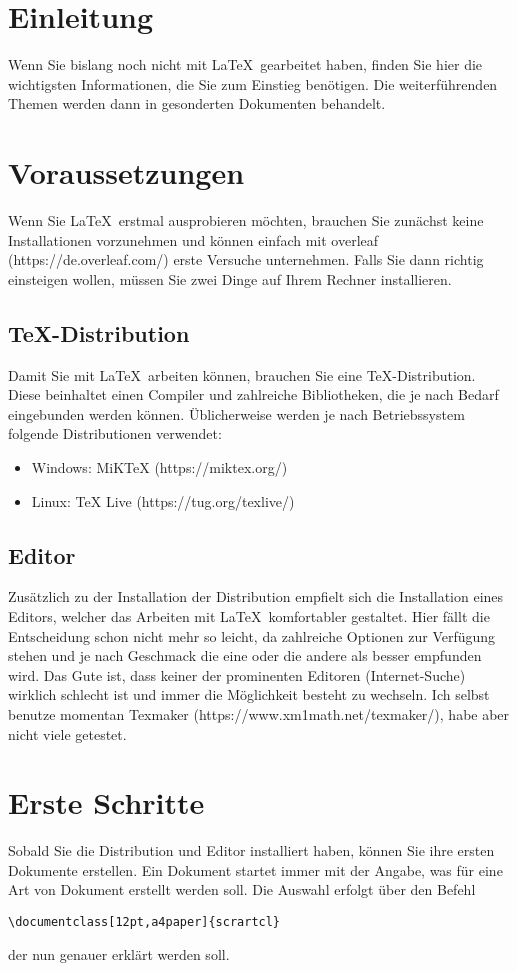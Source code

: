 \documentclass[12pt,a4paper]{scrartcl}
\begin{document}
%
\section{Einleitung}
%
Wenn Sie bislang noch nicht mit \LaTeX\, gearbeitet haben, finden Sie hier die wichtigsten Informationen, die Sie zum Einstieg benötigen.
Die weiterführenden Themen werden dann in gesonderten Dokumenten behandelt. 
%
\section{Voraussetzungen}
%
Wenn Sie \LaTeX\, erstmal ausprobieren möchten, brauchen Sie zunächst keine Installationen vorzunehmen und können einfach mit overleaf (https://de.overleaf.com/) erste Versuche unternehmen.
Falls Sie dann richtig einsteigen wollen, müssen Sie zwei Dinge auf Ihrem Rechner installieren.
%
\subsection{TeX-Distribution}
Damit Sie mit \LaTeX\, arbeiten können, brauchen Sie eine TeX-Distribution.
Diese beinhaltet einen Compiler und zahlreiche Bibliotheken, die je nach Bedarf eingebunden werden können.
Üblicherweise werden je nach Betriebssystem folgende Distributionen verwendet:
%
\begin{itemize}
\item Windows: MiKTeX (https://miktex.org/)
\item Linux: TeX Live (https://tug.org/texlive/)
\end{itemize}
%
\subsection{Editor}
Zusätzlich zu der Installation der Distribution empfielt sich die Installation eines Editors, welcher das Arbeiten mit \LaTeX\, komfortabler gestaltet. 
Hier fällt die Entscheidung schon nicht mehr so leicht, da zahlreiche Optionen zur Verfügung stehen und je nach Geschmack die eine oder die andere als besser empfunden wird.
Das Gute ist, dass keiner der prominenten Editoren (Internet-Suche) wirklich schlecht ist und immer die Möglichkeit besteht zu wechseln.
Ich selbst benutze momentan Texmaker (https://www.xm1math.net/texmaker/), habe aber nicht viele getestet.
%
\section{Erste Schritte}
%
Sobald Sie die Distribution und Editor installiert haben, können Sie ihre ersten Dokumente erstellen. 
Ein Dokument startet immer mit der Angabe, was für eine Art von Dokument erstellt werden soll. 
Die Auswahl erfolgt über den Befehl
%
\begin{verbatim}
\documentclass[12pt,a4paper]{scrartcl}
\end{verbatim}
%
der nun genauer erklärt werden soll.
%
%
\end{document}
